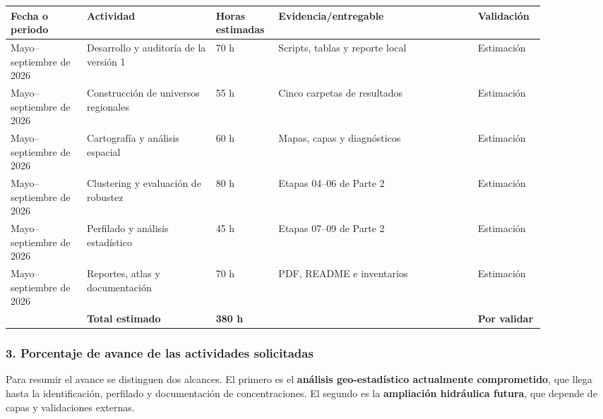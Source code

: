 \documentclass[
  spanish,
]{article}
\newcounter{none} %
\begin{document}
{\def\LTcaptype{none} %
\begin{longtable}[]{@{}p{0.13\linewidth}p{0.22\linewidth}p{0.08\linewidth}p{0.34\linewidth}p{0.11\linewidth}@{}}
\toprule\noalign{}
Fecha o periodo & Actividad & Horas estimadas & Evidencia/entregable &
Validación \\
\midrule\noalign{}
\endhead
\bottomrule\noalign{}
\endlastfoot
Mayo--septiembre de 2026 & Desarrollo y auditoría de la versión 1 & 70 h &
Scripts, tablas y reporte local & Estimación \\
Mayo--septiembre de 2026 & Construcción de universos regionales & 55 h &
Cinco carpetas de resultados & Estimación \\
Mayo--septiembre de 2026 & Cartografía y análisis espacial & 60 h & Mapas,
capas y diagnósticos & Estimación \\
Mayo--septiembre de 2026 & Clustering y evaluación de robustez & 80 h &
Etapas 04--06 de Parte 2 & Estimación \\
Mayo--septiembre de 2026 & Perfilado y análisis estadístico & 45 h & Etapas
07--09 de Parte 2 & Estimación \\
Mayo--septiembre de 2026 & Reportes, atlas y documentación & 70 h & PDF,
README e inventarios & Estimación \\
& \textbf{Total estimado} & \textbf{380 h} & & \textbf{Por validar} \\
\end{longtable}
}

\subsubsection{3. Porcentaje de avance de las actividades
solicitadas}\label{3-porcentaje-de-avance-de-las-actividades-solicitadas}

Para resumir el avance se distinguen dos alcances. El primero es el
\textbf{análisis geo-estadístico actualmente comprometido}, que llega
hasta la identificación, perfilado y documentación de concentraciones.
El segundo es la \textbf{ampliación hidráulica futura}, que depende de
capas y validaciones externas.
\end{document}
